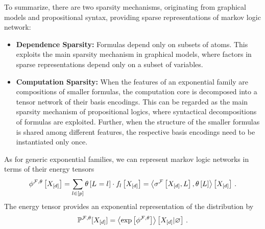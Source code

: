 
To summarize, there are two sparsity mechanisms, originating from graphical models and propositional syntax, providing sparse representations of markov logic network:
\begin{itemize}
    \item \textbf{Dependence Sparsity:} Formulas depend only on subsets of atoms.
    This exploits the main sparsity mechanism in graphical models, where factors in sparse representations depend only on a subset of variables.
    \item \textbf{Computation Sparsity:}
    When the features of an exponential family are compositions of smaller formulas, the computation core is decomposed into a tensor network of their basis encodings.
    This can be regarded as the main sparsity mechanism of propositional logics, where syntactical decompositions of formulas are exploited.
    Further, when the structure of the smaller formulas is shared among different features, the respective basis encodings need to be instantiated only once.
\end{itemize}





As for generic exponential families, we can represent markov logic networks in terms of their energy tensors
\begin{align}
    \phi^{\mathcal{F},\theta}\left[X_{[d]}\right]
    = \sum_{l\in[p]} \theta\left[L_{}=l_{}\right] \cdot f_{l}\left[X_{[d]}\right]
    = \left\langle \sigma^{\mathcal{F}}\left[X_{[d]},L\right],\theta\left[L\right]\right\rangle \left[ X_{[d]} \right] \, .
\end{align}
The energy tensor provides an exponential representation of the distribution by
\begin{align}
    \mathbb{P}^{\mathcal{F},\theta}[X_{[d]}] = \left\langle \mathrm{exp}\left[\phi^{\mathcal{F},\theta}\right]\right\rangle \left[ X_{[d]} | \varnothing \right] \, .
\end{align}


